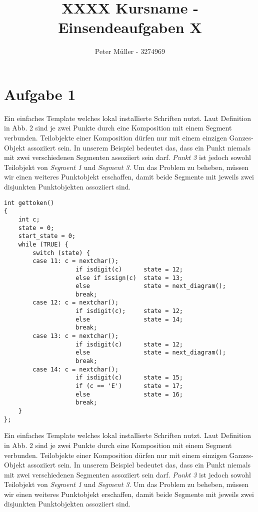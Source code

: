 \documentclass{article}
\title{XXXX Kursname - Einsendeaufgaben X}
\author{Peter Müller - 3274969}
\begin{document}
\setlength{\baselineskip}{1.5em}
\setlength{\parindent}{0em}
\setlength{\parskip}{1em}

\maketitle

\newpage

\section*{Aufgabe 1}

Ein einfaches Template welches lokal installierte Schriften nutzt. Laut Definition in Abb. 2 sind je zwei Punkte durch eine Komposition mit einem Segment verbunden. Teilobjekte einer Komposition dürfen nur mit einem einzigen Ganzes-Objekt assoziiert sein. In unserem Beispiel bedeutet das, dass ein Punkt niemals mit zwei verschiedenen Segmenten assoziiert sein darf. \textit{Punkt 3} ist jedoch sowohl Teilobjekt von \textit{Segment 1} und \textit{Segment 3}. Um das Problem zu beheben, müssen wir einen weiteres Punktobjekt erschaffen, damit beide Segmente mit jeweils zwei disjunkten Punktobjekten assoziiert sind.

\linespread{1}
\begin{verbatim}
int gettoken()
{
    int c;
    state = 0;
    start_state = 0;
    while (TRUE) {
        switch (state) {
        case 11: c = nextchar();
                    if isdigit(c)      state = 12;
                    else if issign(c)  state = 13;
                    else               state = next_diagram();
                    break;
        case 12: c = nextchar();
                    if isdigit(c);     state = 12;
                    else               state = 14;
                    break;
        case 13: c = nextchar();
                    if isdigit(c)      state = 12;
                    else               state = next_diagram();
                    break;
        case 14: c = nextchar();
                    if isdigit(c)      state = 15;
                    if (c == 'E')      state = 17;
                    else               state = 16;
                    break;
    }
};
\end{verbatim}

Ein einfaches Template welches lokal installierte Schriften nutzt. Laut Definition in Abb. 2 sind je zwei Punkte durch eine Komposition mit einem Segment verbunden. Teilobjekte einer Komposition dürfen nur mit einem einzigen Ganzes-Objekt assoziiert sein. In unserem Beispiel bedeutet das, dass ein Punkt niemals mit zwei verschiedenen Segmenten assoziiert sein darf. \textit{Punkt 3} ist jedoch sowohl Teilobjekt von \textit{Segment 1} und \textit{Segment 3}. Um das Problem zu beheben, müssen wir einen weiteres Punktobjekt erschaffen, damit beide Segmente mit jeweils zwei disjunkten Punktobjekten assoziiert sind.
\end{document}
